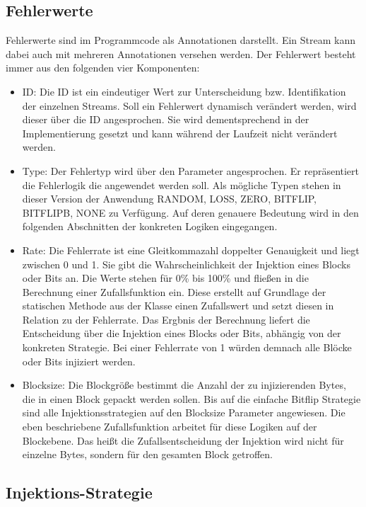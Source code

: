 \subsection{Fehlerwerte}
Fehlerwerte sind im Programmcode als Annotationen darstellt. Ein Stream kann dabei auch mit mehreren Annotationen versehen werden. Der Fehlerwert besteht immer aus den folgenden vier Komponenten:

\begin{itemize}
	\item ID: Die ID ist ein eindeutiger Wert zur Unterscheidung bzw. Identifikation der einzelnen Streams. Soll ein Fehlerwert dynamisch ver\"andert werden, wird dieser \"uber die ID angesprochen. Sie wird dementsprechend in der Implementierung gesetzt und kann w\"ahrend der Laufzeit nicht ver\"andert werden.
	\item Type: Der Fehlertyp wird \"uber den Parameter  angesprochen. Er repr\"asentiert die Fehlerlogik die angewendet werden soll. Als m\"ogliche Typen stehen in dieser Version der Anwendung RANDOM, LOSS, ZERO, BITFLIP, BITFLIPB, NONE zu Verf\"ugung. Auf deren genauere Bedeutung wird in den folgenden Abschnitten der konkreten Logiken eingegangen.
	\item Rate: Die Fehlerrate ist eine Gleitkommazahl doppelter Genauigkeit und liegt zwischen 0 und 1. Sie gibt die Wahrscheinlichkeit der Injektion eines Blocks oder Bits an. Die Werte stehen für 0\% bis 100\% und flie\ss en in die Berechnung einer Zufallsfunktion ein. Diese  erstellt auf Grundlage der statischen Methode  aus der Klasse  einen Zufallswert und setzt diesen in Relation zu der Fehlerrate. Das Ergbnis der Berechnung liefert die Entscheidung über die Injektion eines Blocks oder Bits, abhängig von der konkreten Strategie. Bei einer Fehlerrate von 1 würden demnach alle Blöcke oder Bits injiziert werden.
	\item Blocksize: Die Blockgr\"o\ss e bestimmt die Anzahl der zu injizierenden Bytes, die in einen Block gepackt werden sollen. Bis auf die einfache Bitflip Strategie sind alle Injektionsstrategien auf den Blocksize Parameter angewiesen. Die eben beschriebene Zufallsfunktion arbeitet f\"ur diese Logiken auf der Blockebene. Das hei\ss t die Zufallsentscheidung der Injektion wird nicht f\"ur einzelne Bytes, sondern f\"ur den gesamten Block getroffen.
\end{itemize}

\label{strats}
\subsection{Injektions-Strategie}

